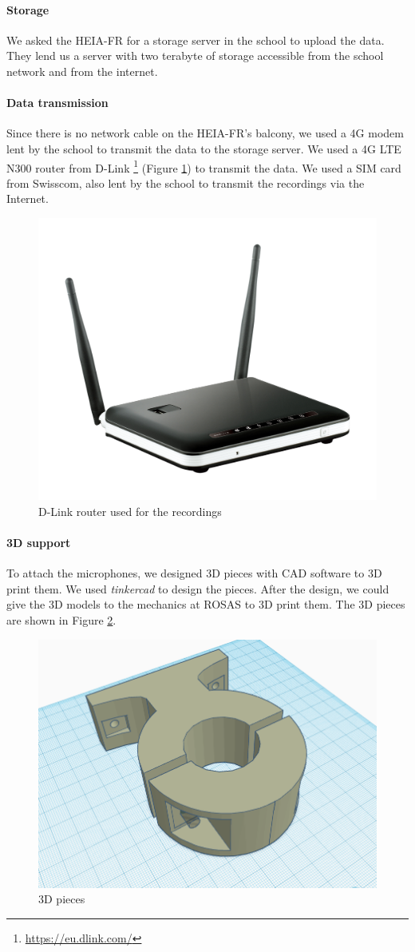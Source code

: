 \paragraph{Storage}

We asked the HEIA-FR for a storage server in the school to upload the data. They lend us a server with two terabyte of storage accessible from the school network and from the internet.

\paragraph{Data transmission}

Since there is no network cable on the HEIA-FR's balcony, we used a 4G modem lent by the school to transmit the data to the storage server. We used a 4G LTE N300 router from D-Link \footnote{\url{https://eu.dlink.com/}} (Figure \ref{fig:4g_lte_router}) to transmit the data. We used a SIM card from Swisscom, also lent by the school to transmit the recordings via the Internet.

\begin{figure}[H]
    \centering
    \includegraphics[width=.5\textwidth]{images/4g_lte_router.png}
    \caption{D-Link router used for the recordings}
    \label{fig:4g_lte_router}
\end{figure}

\paragraph{3D support}

To attach the microphones, we designed 3D pieces with CAD software to 3D print them. We used \textit{tinkercad} to design the pieces. After the design, we could give the 3D models to the mechanics at ROSAS to 3D print them. The 3D pieces are shown in Figure \ref{fig:3d_pieces}.

\begin{figure}[H]
    \centering
    \includegraphics[width=.5\textwidth]{../Images/tinkercad_mic_support.png}
    \caption{3D pieces}
    \label{fig:3d_pieces}
\end{figure}

